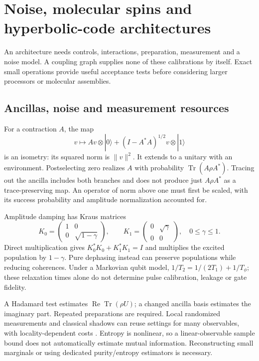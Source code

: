 \documentclass[11pt,oneside,openany]{book}
\theoremstyle{definition}\newtheorem{definition}[theorem]{Definition}
\theoremstyle{remark}\newtheorem{remark}[theorem]{Remark}
\begin{document}
\chapter{Noise, molecular spins and hyperbolic-code architectures}
\label{phys:hardware}

An architecture needs controls, interactions, preparation, measurement and
a noise model. A coupling graph supplies none of these calibrations by
itself. Exact small operations provide useful acceptance tests before
considering larger processors or molecular assemblies.

\section{Ancillas, noise and measurement resources}
For a contraction $A$, the map
\[
 v\longmapsto Av\otimes|0\rangle+
       (I-A^*A)^{1/2}v\otimes|1\rangle
\]
is an isometry: its squared norm is $\|v\|^2$. It extends to a unitary
with an environment. Postselecting zero realizes $A$ with probability
$\operatorname{Tr}(A\rho A^*)$. Tracing out the ancilla includes both
branches and does not produce just $A\rho A^*$ as a trace-preserving map.
An operator of norm above one must first be scaled, with its success
probability and amplitude normalization accounted for.

Amplitude damping has Kraus matrices
\[
 K_0=\begin{pmatrix}1&0\\0&\sqrt{1-\gamma}\end{pmatrix},\qquad
 K_1=\begin{pmatrix}0&\sqrt\gamma\\0&0\end{pmatrix},\quad0\le\gamma\le1.
\]
Direct multiplication gives $K_0^*K_0+K_1^*K_1=I$ and multiplies the
excited population by $1-\gamma$. Pure dephasing instead can preserve
populations while reducing coherences. Under a Markovian qubit model,
$1/T_2=1/(2T_1)+1/T_\phi$; these relaxation times alone do not determine
pulse calibration, leakage or gate fidelity.

A Hadamard test estimates $\operatorname{Re}\operatorname{Tr}(\rho U)$;
a changed ancilla basis estimates the imaginary part. Repeated preparations
are required. Local randomized measurements and classical shadows can
reuse settings for many observables, with locality-dependent costs
\cite{PhysShadows}. Entropy is nonlinear, so a linear-observable sample
bound does not automatically estimate mutual information. Reconstructing
small marginals or using dedicated purity/entropy estimators is necessary.
\end{document}
